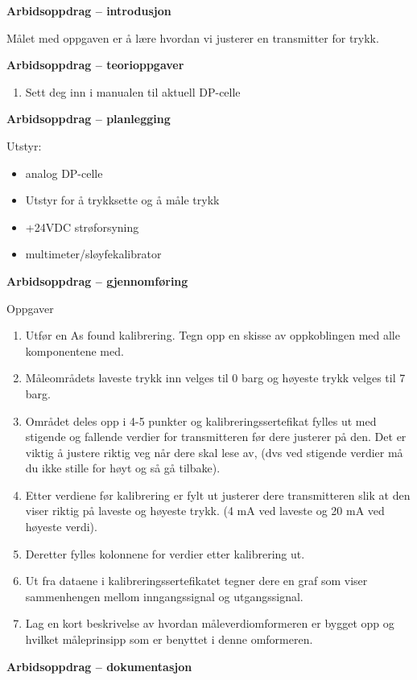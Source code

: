 

\noindent

\vskip 5pt


\textbf{Arbidsoppdrag -- introdusjon}

Målet med oppgaven er å lære hvordan vi justerer en transmitter for trykk.



\textbf{Arbidsoppdrag -- teorioppgaver}

\begin{enumerate}
	\item Sett deg inn i manualen til aktuell DP-celle
\end{enumerate}
\textbf{Arbidsoppdrag -- planlegging}

Utstyr:
\begin{itemize}[noitemsep]
	\item analog DP-celle 
	\item Utstyr for å trykksette og å måle trykk 
	\item +24VDC strøforsyning 
	\item multimeter/sløyfekalibrator
\end{itemize}

\textbf{Arbidsoppdrag -- gjennomføring}

Oppgaver\begin{enumerate}
	\item Utfør en As found kalibrering. Tegn opp en skisse av oppkoblingen med alle komponentene med.
	\item Måleområdets laveste trykk inn velges til 0 barg og høyeste trykk velges til 7 barg.
	\item Området deles opp i 4-5 punkter og kalibreringssertefikat fylles ut med stigende og fallende verdier for transmitteren før dere justerer på den. Det er viktig å justere riktig veg når dere skal lese av, (dvs ved stigende verdier må du ikke stille for høyt og så gå tilbake). 
	\item Etter verdiene før kalibrering er fylt ut justerer dere transmitteren slik at den viser riktig på laveste og høyeste trykk. (4 mA ved laveste og 20 mA ved høyeste verdi).
	\item Deretter fylles kolonnene for verdier etter kalibrering ut.
	\item Ut fra dataene i kalibreringssertefikatet tegner dere en graf som viser sammenhengen mellom inngangssignal og utgangssignal.
	\item Lag en kort beskrivelse av hvordan måleverdiomformeren er bygget opp og hvilket måleprinsipp som er benyttet i denne omformeren.
\end{enumerate}
\textbf{Arbidsoppdrag -- dokumentasjon}

